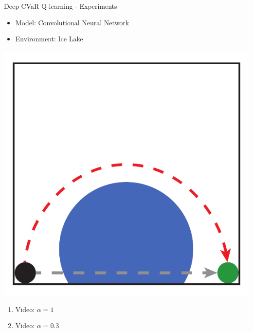 \documentclass{beamer}
\begin{document}


\begin{frame}{Deep CVaR Q-learning - Experiments}
\begin{itemize}
\item Model: Convolutional Neural Network
\item Environment: Ice Lake
\end{itemize}

\center
\includegraphics[width=0.4\linewidth]{../gfx/icelake_full.pdf}


\begin{enumerate}
\item Video: $\alpha=1$
\item Video: $\alpha=0.3$
\end{enumerate}
\end{frame}
\end{document}
